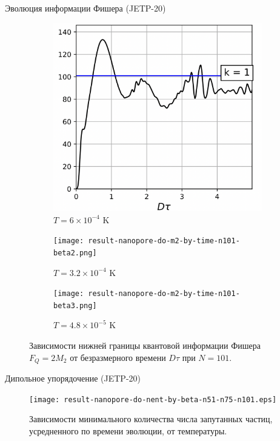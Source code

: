 \begin{frame}{Эволюция информации Фишера (JETP-20)}
  \begin{figure}
    \begin{subfigure}[t]{0.3\textwidth}
    \includegraphics[width=\textwidth]{src/figures/result-nanopore-do-m2-by-time-n101-beta1.png}
    \caption{$T = 6 \times 10^{-4}$ K}
    \end{subfigure}
    \hfill
    \begin{subfigure}[t]{0.3\textwidth}
      \texttt{[image: result-nanopore-do-m2-by-time-n101-beta2.png]}
      \caption{$T = 3.2 \times 10^{-4}$ K}
    \end{subfigure}
    \hfill
    \begin{subfigure}[t]{0.3\textwidth}
      \texttt{[image: result-nanopore-do-m2-by-time-n101-beta3.png]}
      \caption{$T = 4.8 \times 10^{-5}$ K}
    \end{subfigure}
    \caption{Зависимости нижней границы квантовой информации Фишера $F_Q = 2M_2$ от безразмерного времени $D\tau$ при $N = 101$.}
  \end{figure}
\end{frame}

\begin{frame}{Дипольное упорядочение (JETP-20)}
    \begin{figure}
    \texttt{[image: result-nanopore-do-nent-by-beta-n51-n75-n101.eps]}
    \caption{
      Зависимости минимального количества числа запутанных частиц,
      усредненного по времени эволюции, от температуры.
     }
    \end{figure}
\end{frame}
